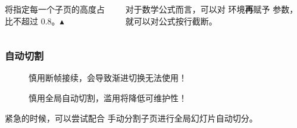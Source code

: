 \begin{shadedsection}
\begin{frame}[fragile]
\begin{columns}[t]
\begin{column}{0.5\textwidth}
      \begin{alertblock}{}
         将指定每一个子页的高度占比不超过 0.8。\textcolor{structure}{$\blacktriangle$}
      \end{alertblock}
      
    \end{column}
    \begin{column}{0.5\textwidth}
      对于数学公式而言，可以对  环境\textbf{再}赋予  参数，就可以对公式按行截断。

    \end{column}
  \end{columns}
\end{frame}

\begin{frame}[fragile]
  \frametitle{自动切割}
  \begin{block}{}
    \begin{description}
      \item[\faExclamationTriangle] 慎用断帧接续，会导致渐进切换无法使用！
      \item[\faExclamationTriangle{} \faExclamationTriangle{}] 慎用全局自动切割，滥用将降低可维护性！
    \end{description}
  \end{block}
  紧急的时候，可以尝试配合  手动分割子页进行全局幻灯片自动切分。
  \begin{columns}
    \begin{column}{0.5\textwidth}
\end{column}
\end{columns}
\end{frame}
\end{shadedsection}
